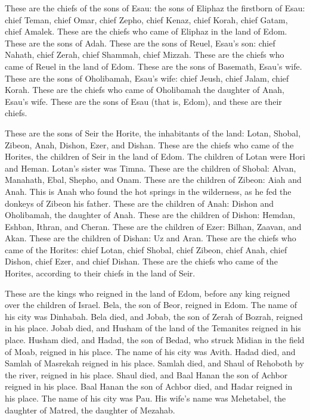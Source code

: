  These are the chiefs of the sons of Esau: the sons of
Eliphaz the firstborn of Esau: chief Teman, chief Omar, chief Zepho,
chief Kenaz,  chief Korah, chief Gatam, chief Amalek.
These are the chiefs who came of Eliphaz in the land of Edom. These are
the sons of Adah.  These are the sons of Reuel, Esau's
son: chief Nahath, chief Zerah, chief Shammah, chief Mizzah. These are
the chiefs who came of Reuel in the land of Edom. These are the sons of
Basemath, Esau's wife.  These are the sons of Oholibamah,
Esau's wife: chief Jeush, chief Jalam, chief Korah. These are the chiefs
who came of Oholibamah the daughter of Anah, Esau's wife.
 These are the sons of Esau (that is, Edom), and these
are their chiefs.

 These are the sons of Seir the Horite, the inhabitants
of the land: Lotan, Shobal, Zibeon, Anah,  Dishon, Ezer,
and Dishan. These are the chiefs who came of the Horites, the children
of Seir in the land of Edom.  The children of Lotan were
Hori and Heman. Lotan's sister was Timna.  These are the
children of Shobal: Alvan, Manahath, Ebal, Shepho, and Onam.
 These are the children of Zibeon: Aiah and Anah. This is
Anah who found the hot springs in the wilderness, as he fed the donkeys
of Zibeon his father.  These are the children of Anah:
Dishon and Oholibamah, the daughter of Anah.  These are
the children of Dishon: Hemdan, Eshban, Ithran, and Cheran.
 These are the children of Ezer: Bilhan, Zaavan, and
Akan.  These are the children of Dishan: Uz and Aran.
 These are the chiefs who came of the Horites: chief
Lotan, chief Shobal, chief Zibeon, chief Anah,  chief
Dishon, chief Ezer, and chief Dishan. These are the chiefs who came of
the Horites, according to their chiefs in the land of Seir.

 These are the kings who reigned in the land of Edom,
before any king reigned over the children of Israel. 
Bela, the son of Beor, reigned in Edom. The name of his city was
Dinhabah.  Bela died, and Jobab, the son of Zerah of
Bozrah, reigned in his place.  Jobab died, and Husham of
the land of the Temanites reigned in his place.  Husham
died, and Hadad, the son of Bedad, who struck Midian in the field of
Moab, reigned in his place. The name of his city was Avith.
 Hadad died, and Samlah of Masrekah reigned in his place.
 Samlah died, and Shaul of Rehoboth by the river, reigned
in his place.  Shaul died, and Baal Hanan the son of
Achbor reigned in his place.  Baal Hanan the son of
Achbor died, and Hadar reigned in his place. The name of his city was
Pau. His wife's name was Mehetabel, the daughter of Matred, the daughter
of Mezahab.

